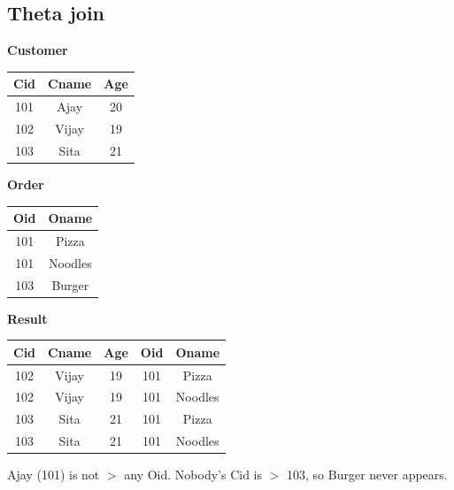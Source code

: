\documentclass[10pt,a4paper]{article}
\begin{document}
\subsection{Theta join}
\begin{exbox}
\small
\begin{minipage}[t]{0.25\linewidth}\centering
\textbf{Customer}\\\begin{tabular}{ccc}\toprule Cid&Cname&Age\\\midrule 101&Ajay&20\\102&Vijay&19\\103&Sita&21\\\bottomrule\end{tabular}
\end{minipage}\hfill
\begin{minipage}[t]{0.2\linewidth}\centering
\textbf{Order}\\\begin{tabular}{cc}\toprule Oid&Oname\\\midrule 101&Pizza\\101&Noodles\\103&Burger\\\bottomrule\end{tabular}
\end{minipage}\hfill
\begin{minipage}[t]{0.45\linewidth}\centering
\textbf{Result}\\\begin{tabular}{ccccc}\toprule Cid&Cname&Age&Oid&Oname\\\midrule 102&Vijay&19&101&Pizza\\102&Vijay&19&101&Noodles\\103&Sita&21&101&Pizza\\103&Sita&21&101&Noodles\\\bottomrule\end{tabular}
\end{minipage}

\smallskip
Ajay (101) is not $>$ any Oid. Nobody's Cid is $>$ 103, so Burger never appears.
\end{exbox}
\end{document}
